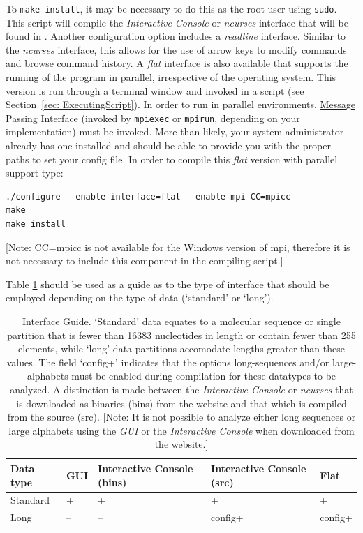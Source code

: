 To \texttt{make install}, it may be necessary to do this as the root user using \texttt{sudo}.
This script will compile the \emph{Interactive Console} or \emph{ncurses} interface that will be found in 
.
Another configuration option includes a \emph{readline} interface.  Similar to the \emph{ncurses} interface, 
this allows for the use of arrow keys to modify commands and browse command history.  %
A \emph{flat} interface is also available that supports the running of the program in parallel, irrespective of 
the operating system. This version is run through a terminal window and invoked in a script (see Section~\ref{sec: ExecutingScript}). 
In order to run \poy in parallel environments, \href{http://www-unix.mcs.anl.gov/mpi/}{Message Passing Interface} 
(invoked by \texttt{mpiexec} or \texttt{mpirun}, depending on your implementation) must be invoked. 
More than likely, your system administrator already has one installed and should be able to provide you with the 
proper paths to set your config file. In order to compile this \emph{flat} version with parallel support type: 
\begin{verbatim}
./configure --enable-interface=flat --enable-mpi CC=mpicc
make
make install
\end{verbatim}
[Note: CC=mpicc is not available for the Windows version of mpi, therefore it is not necessary to include this 
component in the compiling script.] 

Table \ref{InterfaceGuide} should be used as a guide as to the type of interface that should be 
employed depending on the type of data (`standard' or `long').

\begin{table}[th!]
\small
\caption{Interface Guide. `Standard' data equates to a molecular sequence or single partition that is fewer than 16383 
nucleotides in length or contain fewer than 255 elements, while `long' data partitions accomodate lengths greater than these values. The field 
`config+' indicates that the options long-sequences and/or large-alphabets must be enabled during compilation for these 
datatypes to be analyzed. A distinction is made between the \emph{Interactive Console} or \emph{ncurses} that is downloaded as binaries 
(bins) from the website and that which is compiled from the source (src). [Note: It is not possible to analyze either long sequences or
large alphabets using the \emph{GUI} or the \emph{Interactive Console} when downloaded from the \poy website.]}
\label{InterfaceGuide} 
\begin{center}
\renewcommand{\arraystretch}{1.5}
\begin{tabular}{p{2.0cm}  p{0.75cm}  p{3.0cm}  p{3.0cm}  p{1.0cm}} 
\hline
Data type & GUI & Interactive Console (bins) & Interactive Console (src) & Flat \\
\hline
Standard & + & + & + & + \\
Long & -- & -- & config+ & config+\\
\hline
\end{tabular}
\end{center}
\end{table}

